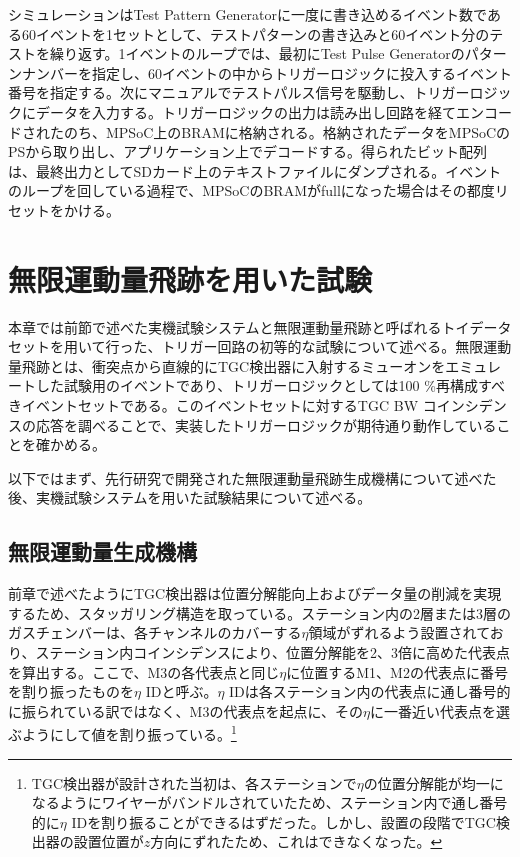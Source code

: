 シミュレーションはTest Pattern Generatorに一度に書き込めるイベント数である60イベントを1セットとして、テストパターンの書き込みと60イベント分のテストを繰り返す。1イベントのループでは、最初にTest Pulse Generatorのパターンナンバーを指定し、60イベントの中からトリガーロジックに投入するイベント番号を指定する。次にマニュアルでテストパルス信号を駆動し、トリガーロジックにデータを入力する。トリガーロジックの出力は読み出し回路を経てエンコードされたのち、MPSoC上のBRAMに格納される。格納されたデータをMPSoCのPSから取り出し、アプリケーション上でデコードする。得られたビット配列は、最終出力としてSDカード上のテキストファイルにダンプされる。イベントのループを回している過程で、MPSoCのBRAMがfullになった場合はその都度リセットをかける。

\section{無限運動量飛跡を用いた試験}
\label{sec_IMT}

本章では前節で述べた実機試験システムと無限運動量飛跡と呼ばれるトイデータセットを用いて行った、トリガー回路の初等的な試験について述べる。無限運動量飛跡とは、衝突点から直線的にTGC検出器に入射するミューオンをエミュレートした試験用のイベントであり、トリガーロジックとしては100 \%再構成すべきイベントセットである。このイベントセットに対するTGC BW コインシデンスの応答を調べることで、実装したトリガーロジックが期待通り動作していることを確かめる。

以下ではまず、先行研究で開発された無限運動量飛跡生成機構について述べた後、実機試験システムを用いた試験結果について述べる。

\subsection{無限運動量生成機構}
\label{subsec_IMT_generation}

前章で述べたようにTGC検出器は位置分解能向上およびデータ量の削減を実現するため、スタッガリング構造を取っている。ステーション内の2層または3層のガスチェンバーは、各チャンネルのカバーする$\eta$領域がずれるよう設置されており、ステーション内コインシデンスにより、位置分解能を2、3倍に高めた代表点を算出する。ここで、M3の各代表点と同じ$\eta$に位置するM1、M2の代表点に番号を割り振ったものを$\eta$ IDと呼ぶ。$\eta$ IDは各ステーション内の代表点に通し番号的に振られている訳ではなく、M3の代表点を起点に、その$\eta$に一番近い代表点を選ぶようにして値を割り振っている。\footnote{TGC検出器が設計された当初は、各ステーションで$\eta$の位置分解能が均一になるようにワイヤーがバンドルされていたため、ステーション内で通し番号的に$\eta$ IDを割り振ることができるはずだった。しかし、設置の段階でTGC検出器の設置位置が$z$方向にずれたため、これはできなくなった。}

